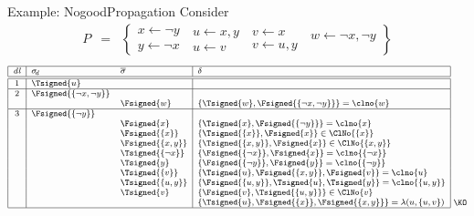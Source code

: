 \begin{frame}{Example: {NogoodPropagation}}
Consider
\begin{eqnarray*}
P
& = &
\left\{
  \begin{array}{l}
x  \leftarrow  \neg y\\%
y  \leftarrow  \neg x
\end{array}
\
\begin{array}{l}
u  \leftarrow x,y\\%
u  \leftarrow v%
\end{array}
\
\begin{array}{l}
v  \leftarrow x\\%
v  \leftarrow u,y%
\end{array}
\
\begin{array}{l}
w  \leftarrow \neg x,\neg y\\
\mbox{~}
\end{array}
\right\}
\end{eqnarray*}
%
\[
\footnotesize
\begin{array}[b]{|c|ll|l|}
\hline
\mathit{dl}& \sigma_{\!d} & \overline{\sigma} & \delta
\\\hline\hline
1 & \Tsigned{u} & &
\\\hline
2 & \Fsigned{\{\neg x,\neg y\}} & &
\\
  & & \Fsigned{w}     & \{\Tsigned{w},\Fsigned{\{\neg x,\neg y\}}\}=\clno{w}
\\\hline
3 & \Fsigned{\{\neg y\}} & &
\\
  & & \Fsigned{x}     & \{\Tsigned{x},\Fsigned{\{\neg y\}}\}=\clno{x}
\\
  & & \Fsigned{\{x\}} & \{\Tsigned{\{x\}},\Fsigned{x}\}\in\ClNo{\{x\}}
\\
  & & \Fsigned{\{x,y\}} & \{\Tsigned{\{x,y\}},\Fsigned{x}\}\in\ClNo{\{x,y\}}
\\
  & & \Tsigned{\{\neg x\}} & \{\Fsigned{\{\neg x\}},\Fsigned{x}\}=\clno{\{\neg x\}}
\\
  & & \Tsigned{y} & \{\Fsigned{\{\neg y\}},\Fsigned{y}\}=\clno{\{\neg y\}}
\\
  & & \Tsigned{\{v\}} & \{\Tsigned{u},\Fsigned{\{x,y\}},\Fsigned\{v\}\}=\clno{u}
\\
  & & \Tsigned{\{u,y\}} & \{\Fsigned{\{u,y\}},\Tsigned{u},\Tsigned{y}\}=\clno{\{u,y\}}
\\
  & & \Tsigned{v} & \{\Fsigned{v},\Tsigned{\{u,y\}}\}\in\ClNo{v}
\\
  & & & \{\Tsigned{u},\Fsigned{\{x\}},\Fsigned{\{x,y\}}\}=\lambda(u,\{u,v\})
\\\hline
\end{array}
~\raisebox{1mm}{\KO}
\]
\end{frame}
